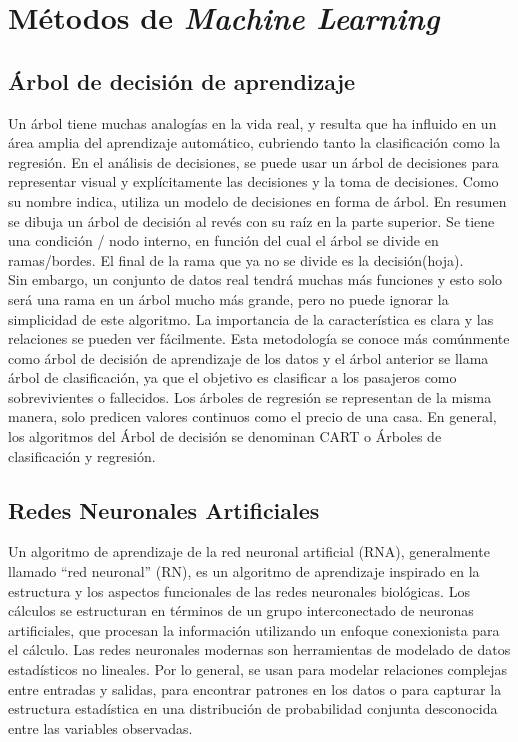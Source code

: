 \section{Métodos de \textit{Machine Learning}}
\subsection{Árbol de decisión de aprendizaje}
\noindent Un árbol tiene muchas analogías en la vida real, y resulta que ha influido en un área amplia del aprendizaje automático, cubriendo tanto la clasificación como la regresión. En el análisis de decisiones, se puede usar un árbol de decisiones para representar visual y explícitamente las decisiones y la toma de decisiones. Como su nombre indica, utiliza un modelo de decisiones en forma de árbol.
En resumen se dibuja un árbol de decisión al revés con su raíz en la parte superior. Se tiene una condición / nodo interno, en función del cual el árbol se divide en ramas/bordes. El final de la rama que ya no se divide es la decisión(hoja).\\

\noindent Sin embargo, un conjunto de datos real tendrá muchas más funciones y esto solo será una rama en un árbol mucho más grande, pero no puede ignorar la simplicidad de este algoritmo. La importancia de la característica es clara y las relaciones se pueden ver fácilmente. Esta metodología se conoce más comúnmente como árbol de decisión de aprendizaje de los datos y el árbol anterior se llama árbol de clasificación, ya que el objetivo es clasificar a los pasajeros como sobrevivientes o fallecidos. Los árboles de regresión se representan de la misma manera, solo predicen valores continuos como el precio de una casa. En general, los algoritmos del Árbol de decisión se denominan CART o Árboles de clasificación y regresión.\\
\subsection{Redes Neuronales Artificiales}
\noindent Un algoritmo de aprendizaje de la red neuronal artificial (RNA), generalmente llamado ``red neuronal'' (RN), es un algoritmo de aprendizaje inspirado en la estructura y los aspectos funcionales de las redes neuronales biológicas. Los cálculos se estructuran en términos de un grupo interconectado de neuronas artificiales, que procesan la información utilizando un enfoque conexionista para el cálculo\cite{11}. Las redes neuronales modernas son herramientas de modelado de datos estadísticos no lineales. Por lo general, se usan para modelar relaciones complejas entre entradas y salidas, para encontrar patrones en los datos o para capturar la estructura estadística en una distribución de probabilidad conjunta desconocida entre las variables observadas.
